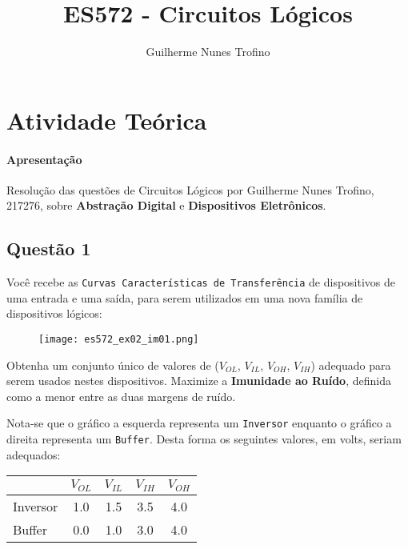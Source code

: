 \documentclass{article}
\title{ES572 - Circuitos Lógicos}
\author{Guilherme Nunes Trofino}
\begin{document}
    \maketitle
\newpage

    \section{Atividade Teórica}
        \paragraph{Apresentação}Resolução das questões de Circuitos Lógicos por Guilherme Nunes Trofino, 217276, sobre \textbf{Abstração Digital} e \textbf{Dispositivos Eletrônicos}.

        \subsection{Questão 1}
            \begin{exercise}
                Você recebe as \texttt{Curvas Características de Transferência} de dispositivos de uma entrada e uma saída, para serem utilizados em uma nova família de dispositivos lógicos:
                    \begin{figure}[H]
                        \centering
                        \texttt{[image: es572\_ex02\_im01.png]}
                    \end{figure} \noindent
                Obtenha um conjunto único de valores de ($V_{OL}$, $V_{IL}$, $V_{OH}$, $V_{IH}$) adequado para serem usados nestes dispositivos. Maximize a \textbf{Imunidade ao Ruído}, definida como a menor entre as duas margens de ruído.
            \end{exercise}
            \begin{resolution}
                Nota-se que o gráfico a esquerda representa um \texttt{Inversor} enquanto o gráfico a direita representa um \texttt{Buffer}. Desta forma os seguintes valores, em volts, seriam adequados:
                    \begin{table}[H]
                        \centering  
                        \begin{tabular}[]{l|cccc}\hline
                                     & $V_{OL}$ & $V_{IL}$ & $V_{IH}$ & $V_{OH}$\\\hline
                            Inversor & 1.0      & 1.5      & 3.5      & 4.0\\
                            Buffer   & 0.0      & 1.0      & 3.0      & 4.0\\\hline
                        \end{tabular}
                    \end{table}
            \end{resolution}
\end{document}
